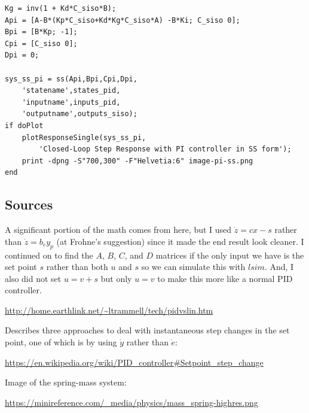 \documentclass[10pt,letterpaper]{article}
\begin{document}
\begin{verbatim}
Kg = inv(1 + Kd*C_siso*B);
Api = [A-B*(Kp*C_siso+Kd*Kg*C_siso*A) -B*Ki; C_siso 0];
Bpi = [B*Kp; -1];
Cpi = [C_siso 0];
Dpi = 0;

sys_ss_pi = ss(Api,Bpi,Cpi,Dpi,
    'statename',states_pid,
    'inputname',inputs_pid,
    'outputname',outputs_siso);
if doPlot
    plotResponseSingle(sys_ss_pi,
        'Closed-Loop Step Response with PI controller in SS form');
    print -dpng -S"700,300" -F"Helvetia:6" image-pi-ss.png
end
\end{verbatim}

\subsection*{Sources}
A significant portion of the math comes from here, but I used $\dot{z} = cx - s$ rather than $\dot{z} = b_e y_p$ (at Frohne's suggestion) since it made the end result look cleaner. I continued on to find the $A$, $B$, $C$, and $D$ matrices if the only input we have is the set point $s$ rather than both $u$ and $s$ so we can simulate this with $lsim$. And, I also did not set $u = v + s$ but only $u = v$ to make this more like a normal PID controller.

\url{http://home.earthlink.net/~ltrammell/tech/pidvslin.htm}

Describes three approaches to deal with instantaneous step changes in the set point, one of which is by using $\dot{y}$ rather than $\dot{e}$:

\url{https://en.wikipedia.org/wiki/PID_controller#Setpoint_step_change}

Image of the spring-mass system:

\url{https://minireference.com/_media/physics/mass_spring-highres.png}
\end{document}
